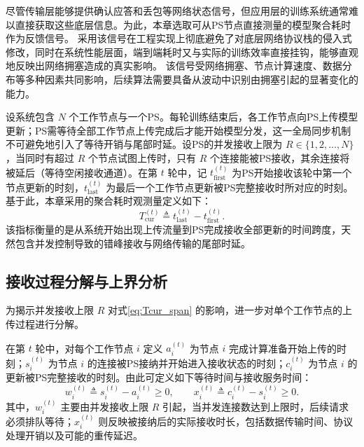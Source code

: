 \documentclass[master, vlined]{DissertUESTC}
\begin{document}
	尽管传输层能够提供确认应答和丢包等网络状态信号，但应用层的训练系统通常难以直接获取这些底层信息。为此，本章选取可从PS节点直接测量的模型聚合耗时作为反馈信号。
	采用该信号在工程实现上彻底避免了对底层网络协议栈的侵入式修改，同时在系统性能层面，端到端耗时又与实际的训练效率直接挂钩，能够直观地反映出网络拥塞造成的真实影响。
	该信号受网络拥塞、节点计算速度、数据分布等多种因素共同影响，后续算法需要具备从波动中识别由拥塞引起的显著变化的能力。

	设系统包含 $N$ 个工作节点与一个PS。每轮训练结束后，各工作节点向PS上传模型更新；PS需等待全部工作节点上传完成后才能开始模型分发，这一全局同步机制不可避免地引入了等待开销与尾部时延。设PS的并发接收上限为 $R\in\{1,2,\dots,N\}$，当同时有超过 $R$ 个节点试图上传时，只有 $R$ 个连接能被PS接收，其余连接将被延后（等待空闲接收通道）。在第 $t$ 轮中，记 $t_{\mathrm{first}}^{(t)}$ 为PS开始接收该轮中第一个节点更新的时刻，$t_{\mathrm{last}}^{(t)}$ 为最后一个工作节点更新被PS完整接收时所对应的时刻。基于此，本章采用的聚合耗时观测量定义如下：
	\begin{equation}
		T_{\mathrm{cur}}^{(t)} \triangleq t_{\mathrm{last}}^{(t)} - t_{\mathrm{first}}^{(t)}.
	\label{eq:Tcur_span}
	\end{equation}
	该指标衡量的是从系统开始出现上传流量到PS完成接收全部更新的时间跨度，天然包含并发控制导致的错峰接收与网络传输的尾部时延。

	\subsection{接收过程分解与上界分析}
	\label{subsec:span_decompose}

	为揭示并发接收上限 $R$ 对式\eqref{eq:Tcur_span} 的影响，进一步对单个工作节点的上传过程进行分解。

	在第 $t$ 轮中，对每个工作节点 $i$ 定义 $a_i^{(t)}$ 为节点 $i$ 完成计算准备开始上传的时刻；$s_i^{(t)}$ 为节点 $i$ 的连接被PS接纳并开始进入接收状态的时刻；$c_i^{(t)}$ 为节点 $i$ 的更新被PS完整接收的时刻。由此可定义如下等待时间与接收服务时间：
	\begin{equation}
		w_i^{(t)} \triangleq s_i^{(t)} - a_i^{(t)} \ge 0,\qquad
		x_i^{(t)} \triangleq c_i^{(t)} - s_i^{(t)} \ge 0.
	\label{eq:w_x_def}
	\end{equation}
	其中，$w_i^{(t)}$ 主要由并发接收上限 $R$ 引起，当并发连接数达到上限时，后续请求必须排队等待；$x_i^{(t)}$ 则反映被接纳后的实际接收时长，包括数据传输时间、协议处理开销以及可能的重传延迟。
\end{document}
